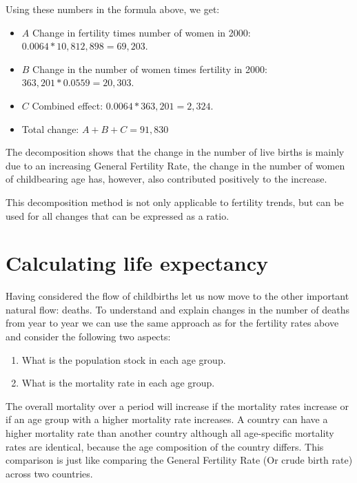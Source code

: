 \documentclass[
]{book}
\providecommand{\tightlist}{%
  \setlength{\itemsep}{0pt}\setlength{\parskip}{0pt}}
\begin{document}
Using these numbers in the formula above, we get:

\begin{itemize}
\tightlist
\item
  \(A\) Change in fertility times number of women in 2000: \(0.0064*10,812,898=69,203\).
\item
  \(B\) Change in the number of women times fertility in 2000: \(363,201*0.0559=20,303\).
\item
  \(C\) Combined effect: \(0.0064*363,201=2,324\).
\item
  Total change: \(A+B+C= 91,830\)
\end{itemize}

The decomposition shows that the change in the number of live births is mainly due to an increasing General Fertility Rate, the change in the number of women of childbearing age has, however, also contributed positively to the increase.

This decomposition method is not only applicable to fertility trends, but can be used for all changes that can be expressed as a ratio.

\hypertarget{calculating-life-expectancy}{%
\section{Calculating life expectancy}\label{calculating-life-expectancy}}

Having considered the flow of childbirths let us now move to the other important natural flow: deaths. To understand and explain changes in the number of deaths from year to year we can use the same approach as for the fertility rates above and consider the following two aspects:

\begin{enumerate}
\def\labelenumi{\arabic{enumi}.}
\tightlist
\item
  What is the population stock in each age group.
\item
  What is the mortality rate in each age group.
\end{enumerate}

The overall mortality over a period will increase if the mortality rates increase or if an age group with a higher mortality rate increases. A country can have a higher mortality rate than another country although all age-specific mortality rates are identical, because the age composition of the country differs. This comparison is just like comparing the General Fertility Rate (Or crude birth rate) across two countries.
\end{document}
